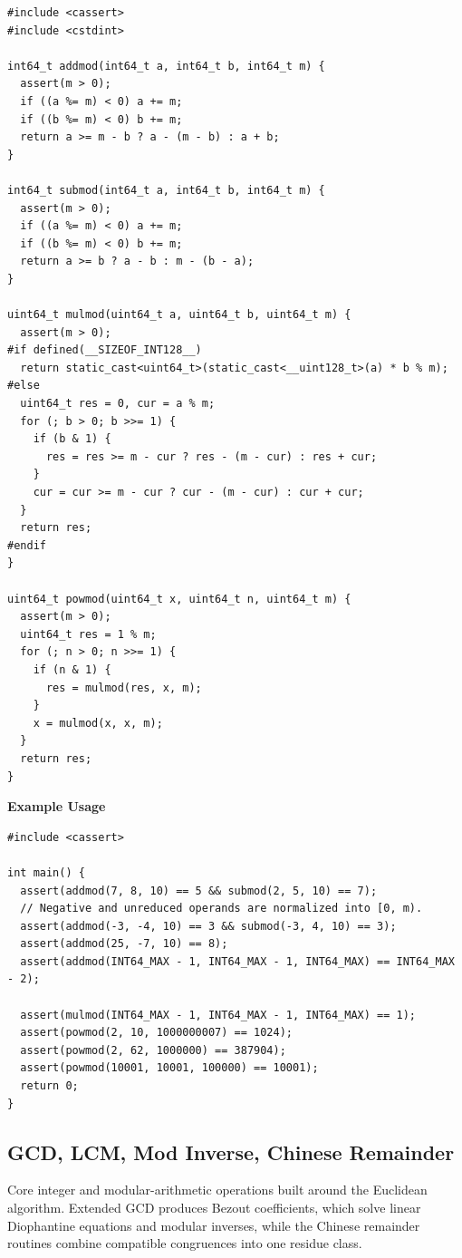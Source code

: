 \begin{lstlisting}[style=cpp]
#include <cassert>
#include <cstdint>

int64_t addmod(int64_t a, int64_t b, int64_t m) {
  assert(m > 0);
  if ((a %= m) < 0) a += m;
  if ((b %= m) < 0) b += m;
  return a >= m - b ? a - (m - b) : a + b;
}

int64_t submod(int64_t a, int64_t b, int64_t m) {
  assert(m > 0);
  if ((a %= m) < 0) a += m;
  if ((b %= m) < 0) b += m;
  return a >= b ? a - b : m - (b - a);
}

uint64_t mulmod(uint64_t a, uint64_t b, uint64_t m) {
  assert(m > 0);
#if defined(__SIZEOF_INT128__)
  return static_cast<uint64_t>(static_cast<__uint128_t>(a) * b % m);
#else
  uint64_t res = 0, cur = a % m;
  for (; b > 0; b >>= 1) {
    if (b & 1) {
      res = res >= m - cur ? res - (m - cur) : res + cur;
    }
    cur = cur >= m - cur ? cur - (m - cur) : cur + cur;
  }
  return res;
#endif
}

uint64_t powmod(uint64_t x, uint64_t n, uint64_t m) {
  assert(m > 0);
  uint64_t res = 1 % m;
  for (; n > 0; n >>= 1) {
    if (n & 1) {
      res = mulmod(res, x, m);
    }
    x = mulmod(x, x, m);
  }
  return res;
}
\end{lstlisting}
\textbf{Example Usage}\par
\begin{lstlisting}[style=cpp]
#include <cassert>

int main() {
  assert(addmod(7, 8, 10) == 5 && submod(2, 5, 10) == 7);
  // Negative and unreduced operands are normalized into [0, m).
  assert(addmod(-3, -4, 10) == 3 && submod(-3, 4, 10) == 3);
  assert(addmod(25, -7, 10) == 8);
  assert(addmod(INT64_MAX - 1, INT64_MAX - 1, INT64_MAX) == INT64_MAX - 2);

  assert(mulmod(INT64_MAX - 1, INT64_MAX - 1, INT64_MAX) == 1);
  assert(powmod(2, 10, 1000000007) == 1024);
  assert(powmod(2, 62, 1000000) == 387904);
  assert(powmod(10001, 10001, 100000) == 10001);
  return 0;
}
\end{lstlisting}
\subsection{GCD, LCM, Mod Inverse, Chinese Remainder}
\label{sec:6.3.2}
Core integer and modular-arithmetic operations built around the Euclidean algorithm. Extended GCD produces Bezout coefficients, which solve linear Diophantine equations and modular inverses, while the Chinese remainder routines combine compatible congruences into one residue class.


